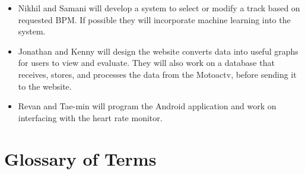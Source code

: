 \documentclass[letterpaper,english, 12pt]{scrreprt}
\begin{document}
\begin{itemize}
	\item Nikhil and Samani will develop a system to select or modify a track based on requested BPM. If possible they will incorporate machine learning into the system.
	\item Jonathan and Kenny will design the website converts data into useful graphs for users to view and evaluate. They will also work on a database that receives, stores, and processes the data from the Motoactv, before sending it to the website.
	\item Revan and Tae-min will program the Android application and work on interfacing with the heart rate monitor.
\end{itemize}

\section{Glossary of Terms}
\end{document}

